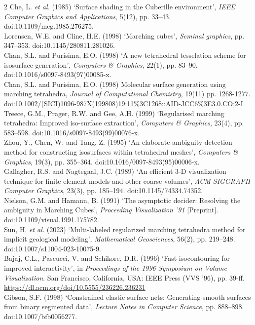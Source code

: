 \documentclass[]{article}
\begin{document}
\begin{multicols}{2}
Che, L. \emph{et al.} (1985) `Surface shading in the Cuberille environment', \emph{IEEE Computer Graphics and Applications}, 5(12), pp. 33--43. doi:10.1109/mcg.1985.276275.\medskip\\
Lorensen, W.E. and Cline, H.E. (1998) `Marching cubes', \emph{Seminal graphics}, pp. 347--353. doi:10.1145/280811.281026.\medskip\\
Chan, S.L. and Purisima, E.O. (1998) `A new tetrahedral tesselation scheme for isosurface generation', \emph{Computers \& Graphics}, 22(1), pp. 83--90. doi:10.1016/s0097-8493(97)00085-x.\medskip\\
Chan, S.L. and Purisima, E.O. (1998) \textquotesingle Molecular surface generation using marching tetrahedra\textquotesingle, \emph{Journal of Computational Chemistry}, 19(11) pp. 1268-1277. doi:10.1002/(SICI)1096-987X(199808)19:11\%3C1268::AID-JCC6\%3E3.0.CO;2-I\medskip\\
Treece, G.M., Prager, R.W. and Gee, A.H. (1999) `Regularised marching tetrahedra: Improved iso-surface extraction', \emph{Computers \& Graphics}, 23(4), pp. 583--598. doi:10.1016/s0097-8493(99)00076-x.\medskip\\
Zhou, Y., Chen, W. and Tang, Z. (1995) `An elaborate ambiguity detection method for constructing isosurfaces within tetrahedral meshes', \emph{Computers \& Graphics}, 19(3), pp. 355--364. doi:10.1016/0097-8493(95)00006-x.\medskip\\
Gallagher, R.S. and Nagtegaal, J.C. (1989) `An efficient 3-D visualization technique for finite element models and other coarse volumes', \emph{ACM SIGGRAPH Computer Graphics}, 23(3), pp. 185--194. doi:10.1145/74334.74352.\medskip\\
Nielson, G.M. and Hamann, B. (1991) `The asymptotic decider: Resolving the ambiguity in Marching Cubes', \emph{Proceeding Visualization '91} {[}Preprint{]}. doi:10.1109/visual.1991.175782.\medskip\\
Sun, H. \emph{et al.} (2023) `Multi-labeled regularized marching tetrahedra method for implicit geological modeling', \emph{Mathematical Geosciences}, 56(2), pp. 219--248. doi:10.1007/s11004-023-10075-9.\medskip\\
Bajaj, C.L., Pascucci, V. and Schikore, D.R. (1996) `Fast isocontouring for improved interactivity', in \emph{Proceedings of the 1996 Symposium on Volume Visualization}. San Francisco, California, USA: IEEE Press (VVS '96), pp. 39-ff. \url{https://dl.acm.org/doi/10.5555/236226.236231}\medskip\\
Gibson, S.F. (1998) `Constrained elastic surface nets: Generating smooth surfaces from binary segmented data', \emph{Lecture Notes in Computer Science}, pp. 888--898. doi:10.1007/bfb0056277.\medskip\\

\end{multicols}
\end{document}
